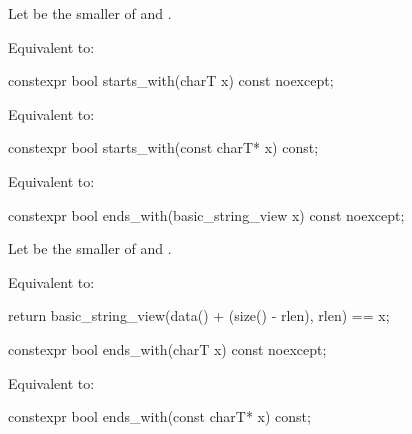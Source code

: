 \begin{itemdescr}
\pnum
Let  be the smaller of  and .

\pnum
\effects
Equivalent to: 
\end{itemdescr}

%
\begin{itemdecl}
constexpr bool starts_with(charT x) const noexcept;
\end{itemdecl}

\begin{itemdescr}
\pnum
\effects
Equivalent to: 
\end{itemdescr}

%
\begin{itemdecl}
constexpr bool starts_with(const charT* x) const;
\end{itemdecl}

\begin{itemdescr}
\pnum
\effects
Equivalent to: 
\end{itemdescr}

%
\begin{itemdecl}
constexpr bool ends_with(basic_string_view x) const noexcept;
\end{itemdecl}

\begin{itemdescr}
\pnum
Let  be the smaller of  and .

\pnum
\effects
Equivalent to:
\begin{codeblock}
return basic_string_view(data() + (size() - rlen), rlen) == x;
\end{codeblock}
\end{itemdescr}

%
\begin{itemdecl}
constexpr bool ends_with(charT x) const noexcept;
\end{itemdecl}

\begin{itemdescr}
\pnum
\effects
Equivalent to: 
\end{itemdescr}

%
\begin{itemdecl}
constexpr bool ends_with(const charT* x) const;
\end{itemdecl}

